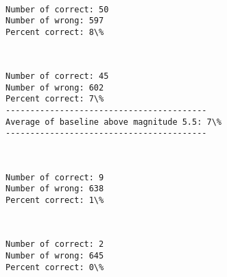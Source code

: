 \documentclass[11pt]{article}
\begin{document}
    \begin{center}
    \end{center}
    { \hspace*{\fill} \\}
    
    \begin{Verbatim}[commandchars=\\\{\}]
Number of correct: 50
Number of wrong: 597
Percent correct: 8\%

    \end{Verbatim}

    \begin{center}
    \end{center}
    { \hspace*{\fill} \\}
    
    \begin{Verbatim}[commandchars=\\\{\}]
Number of correct: 45
Number of wrong: 602
Percent correct: 7\%
-----------------------------------------
Average of baseline above magnitude 5.5: 7\%
-----------------------------------------

    \end{Verbatim}

    \begin{center}
    \end{center}
    { \hspace*{\fill} \\}
    
    \begin{Verbatim}[commandchars=\\\{\}]
Number of correct: 9
Number of wrong: 638
Percent correct: 1\%

    \end{Verbatim}

    \begin{center}
    \end{center}
    { \hspace*{\fill} \\}
    
    \begin{Verbatim}[commandchars=\\\{\}]
Number of correct: 2
Number of wrong: 645
Percent correct: 0\%

    \end{Verbatim}
\end{document}
